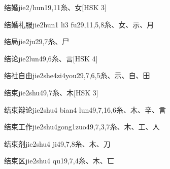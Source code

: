 \begin{EntryWithPhonetic}{结婚}{jie2/hun1}{9,11}{⽷、⼥}[HSK 3]
\end{EntryWithPhonetic}

\begin{EntryWithPhonetic}{结婚礼服}{jie2hun1 li3 fu2}{9,11,5,8}{⽷、⼥、⽰、⽉}
\end{EntryWithPhonetic}

\begin{EntryWithPhonetic}{结局}{jie2ju2}{9,7}{⽷、⼫}
\end{EntryWithPhonetic}

\begin{EntryWithPhonetic}{结论}{jie2lun4}{9,6}{⽷、⾔}[HSK 4]
\end{EntryWithPhonetic}

\begin{EntryWithPhonetic}{结社自由}{jie2she4zi4you2}{9,7,6,5}{⽷、⽰、⾃、⽥}
\end{EntryWithPhonetic}

\begin{EntryWithPhonetic}{结束}{jie2shu4}{9,7}{⽷、⽊}[HSK 3]
\end{EntryWithPhonetic}

\begin{EntryWithPhonetic}{结束辩论}{jie2shu4 bian4 lun4}{9,7,16,6}{⽷、⽊、⾟、⾔}
\end{EntryWithPhonetic}

\begin{EntryWithPhonetic}{结束工作}{jie2shu4gong1zuo4}{9,7,3,7}{⽷、⽊、⼯、⼈}
\end{EntryWithPhonetic}

\begin{EntryWithPhonetic}{结束剂}{jie2shu4 ji4}{9,7,8}{⽷、⽊、⼑}
\end{EntryWithPhonetic}

\begin{EntryWithPhonetic}{结束区}{jie2shu4 qu1}{9,7,4}{⽷、⽊、⼖}
\end{EntryWithPhonetic}

